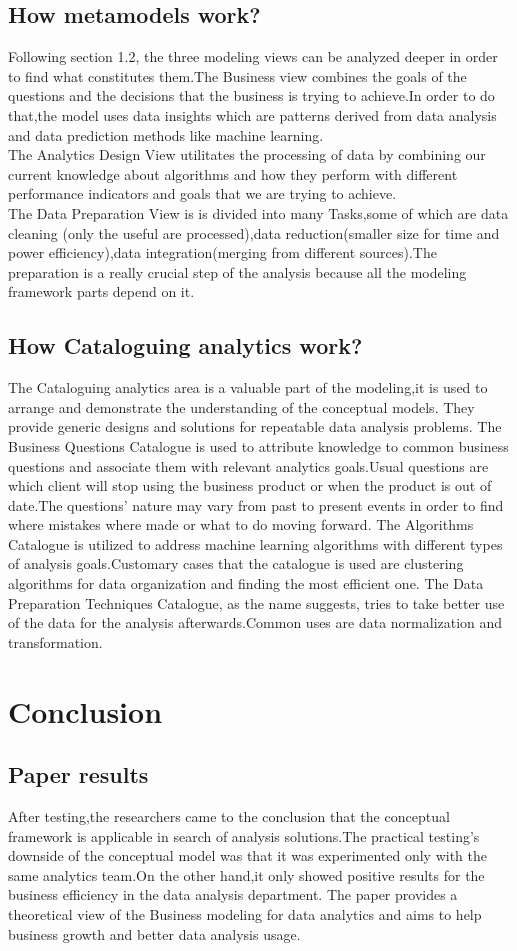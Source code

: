 \documentclass{article}
\begin{document}
\subsection{How metamodels work?}
Following section 1.2, the three modeling views can be analyzed deeper in order to find what constitutes them.The Business view combines the goals of the questions and the decisions that the business is trying to achieve.In order to do that,the model uses data insights which are patterns derived from data analysis and data prediction methods like machine learning.\\
The Analytics Design View utilitates the processing of data by combining our current knowledge about algorithms and how they perform with different performance indicators and goals that we are trying to achieve.\\
The Data Preparation View is is divided into many Tasks,some of which are data cleaning (only the useful are processed),data reduction(smaller size for time and power efficiency),data integration(merging from different sources).The preparation is a really crucial step of the analysis because all the modeling framework parts depend on it.
\subsection{How Cataloguing analytics work?}
The Cataloguing analytics area is a valuable part of the modeling,it is used to arrange and demonstrate the understanding of  the conceptual models. They provide generic designs and solutions for repeatable data analysis problems. The Business Questions Catalogue is used to attribute knowledge to common business questions and associate them with relevant analytics goals.Usual questions are which client will stop using the business product or when the product is out of date.The questions' nature may vary from past to present events in order to find where mistakes where made or what to do moving forward.\newline
The Algorithms Catalogue is utilized to address machine learning algorithms with different types of analysis goals.Customary cases that the catalogue is used are clustering algorithms for data organization and finding the most efficient one. The Data Preparation Techniques Catalogue, as the name suggests, tries to take better use of the data for the analysis afterwards.Common uses are data normalization and transformation.
\section{Conclusion}
\subsection{Paper results}
After testing,the researchers came to the conclusion that the conceptual framework is applicable in search of analysis solutions.The practical testing's downside of the conceptual model was that it was experimented only with the same analytics team.On the other hand,it only showed positive results for the business efficiency in the data analysis department.
The paper provides a theoretical view of the Business modeling for data analytics and aims to help business growth and better data analysis usage. 
\end{document}
